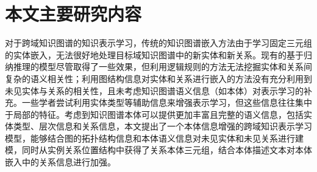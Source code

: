 


\section{本文主要研究内容}
对于跨域知识图谱的知识表示学习，传统的知识图谱嵌入方法由于学习固定三元组的实体嵌入，无法很好地处理目标域知识图谱中的新实体和新关系。现有的基于归纳推理的模型尽管取得了一些效果，但利用逻辑规则的方法无法挖掘实体和关系间复杂的语义相关性；利用图结构信息对实体和关系进行嵌入的方法没有充分利用到未见实体与关系的相关性，且未考虑知识图谱语义信息（如本体）对表示学习的补充。一些学者尝试利用实体类型等辅助信息来增强表示学习，但这些信息往往集中于局部的特征。考虑到知识图谱本体可以提供更加丰富且完整的语义信息，包括实体类型、层次信息和关系信息，本文提出了一个本体信息增强的跨域知识表示学习模型，能够结合图的拓扑结构信息和本体语义信息对未见实体和未见关系进行建模，同时从实例关系位置结构中获得了关系本体三元组，结合本体描述文本对本体嵌入中的关系信息进行加强。

